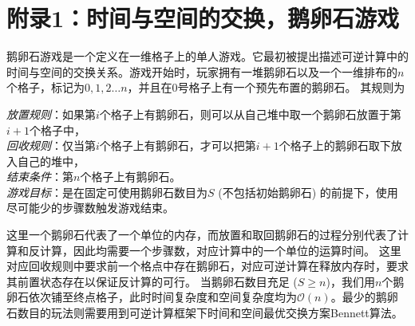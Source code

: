 \documentclass[A4,twoside,UTF8]{ctexart}
\newcommand{\bigO}{{\mathcal{O}}}
\begin{document}
\section{附录1：时间与空间的交换，鹅卵石游戏}\label{sec:pebblegame}
鹅卵石游戏是一个定义在一维格子上的单人游戏。它最初被提出描述可逆计算中的时间与空间的交换关系。游戏开始时，玩家拥有一堆鹅卵石以及一个一维排布的$n$个格子，标记为$0,1,2\ldots n$，并且在$0$号格子上有一个预先布置的鹅卵石。
其规则为
\begin{tcolorbox}[width=\textwidth, title=鹅卵石游戏-可逆计算版本]
    \textit{放置规则}：如果第$i$个格子上有鹅卵石，则可以从自己堆中取一个鹅卵石放置于第$i+1$个格子中，\\
    \textit{回收规则}：仅当第$i$个格子上有鹅卵石，才可以把第$i+1$个格子上的鹅卵石取下放入自己的堆中，\\
    \textit{结束条件}：第$n$个格子上有鹅卵石。\\
    \textit{游戏目标}：是在固定可使用鹅卵石数目为$S$ (不包括初始鹅卵石) 的前提下，使用尽可能少的步骤数触发游戏结束。
\end{tcolorbox}
这里一个鹅卵石代表了一个单位的内存，而放置和取回鹅卵石的过程分别代表了计算和反计算，因此均需要一个步骤数，对应计算中的一个单位的运算时间。
这里对应回收规则中要求前一个格点中存在鹅卵石，对应可逆计算在释放内存时，要求其前置状态存在以保证反计算的可行。
当鹅卵石数目充足 ($S\geq n$)，我们用$n$个鹅卵石依次铺至终点格子，此时时间复杂度和空间复杂度均为$\bigO(n)$。最少的鹅卵石数目的玩法则需要用到可逆计算框架下时间和空间最优交换方案Bennett算法。
\end{document}
